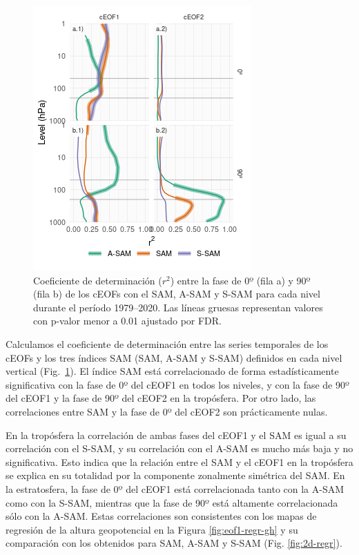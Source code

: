 \documentclass[12pt,oneside]{reedthesis}
\begin{document}
\begin{figure}
\includegraphics{figures/40-sam-ceof/sam-eof-vertical-1} \caption{Coeficiente de determinación (\(r^2\)) entre la fase de 0º (fila a) y 90º (fila b) de los cEOFs con el SAM, A-SAM y S-SAM para cada nivel durante el período 1979--2020.
Las líneas gruesas representan valores con p-valor menor a 0.01 ajustado por FDR.}\label{fig:sam-eof-vertical}
\end{figure}

Calculamos el coeficiente de determinación entre las series temporales de los cEOFs y los tres índices SAM (SAM, A-SAM y S-SAM) definidos en cada nivel vertical (Fig.~\ref{fig:sam-eof-vertical}).
El índice SAM está correlacionado de forma estadísticamente significativa con la fase de 0º del cEOF1 en todos los niveles, y con la fase de 90º del cEOF1 y la fase de 90º del cEOF2 en la tropósfera.
Por otro lado, las correlaciones entre SAM y la fase de 0º del cEOF2 son prácticamente nulas.

En la tropósfera la correlación de ambas fases del cEOF1 y el SAM es igual a su correlación con el S-SAM, y su correlación con el A-SAM es mucho más baja y no significativa.
Esto indica que la relación entre el SAM y el cEOF1 en la tropósfera se explica en su totalidad por la componente zonalmente simétrica del SAM.
En la estratosfera, la fase de 0º del cEOF1 está correlacionada tanto con la A-SAM como con la S-SAM, mientras que la fase de 90º está altamente correlacionada sólo con la A-SAM.
Estas correlaciones son consistentes con los mapas de regresión de la altura geopotencial en la Figura \ref{fig:eof1-regr-gh} y su comparación con los obtenidos para SAM, A-SAM y S-SAM (Fig. \ref{fig:2d-regr}).
\end{document}

